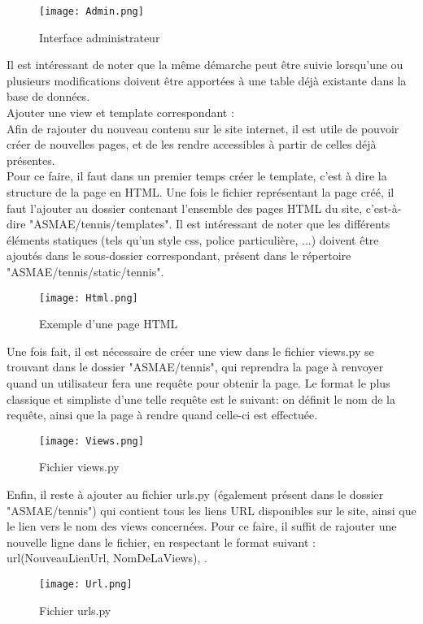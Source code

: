 \begin{figure}
\centering
\texttt{[image: Admin.png]}
\caption{Interface administrateur}
\end{figure}

Il est intéressant de noter que la même démarche peut être suivie lorsqu'une ou plusieurs modifications doivent être apportées à une table déjà existante dans la base de données.\\

Ajouter une view et template correspondant :\\

Afin de rajouter du nouveau contenu sur le site internet, il est utile de pouvoir créer de nouvelles pages, et de les rendre accessibles à partir de celles déjà présentes.\\

Pour ce faire, il faut dans un premier temps créer le template, c'est à dire la structure de la page en HTML. Une fois le fichier représentant la page créé, il faut l'ajouter au dossier contenant l'ensemble des pages HTML du site, c'est-à-dire "ASMAE/tennis/templates". Il est intéressant de noter que les différents éléments statiques (tels qu'un style css, police particulière, ...) doivent être ajoutés dans le sous-dossier correspondant, présent dans le répertoire "ASMAE/tennis/static/tennis".\\

\begin{figure}
\centering
\texttt{[image: Html.png]}
\caption{Exemple d'une page HTML}
\end{figure}

Une fois fait, il est nécessaire de créer une view dans le fichier views.py se trouvant dans le dossier "ASMAE/tennis", qui reprendra la page à renvoyer quand un utilisateur fera une requête pour obtenir la page. Le format le plus classique et simpliste d'une telle requête est le suivant: on définit le nom de la requête, ainsi que la page à rendre quand celle-ci est effectuée.\\

\begin{figure}
\centering
\texttt{[image: Views.png]}
\caption{Fichier views.py}
\end{figure}

Enfin, il reste à ajouter au fichier urls.py (également présent dans le dossier "ASMAE/tennis") qui contient tous les liens URL disponibles sur le site, ainsi que le lien vers le nom des views concernées. Pour ce faire, il suffit de rajouter une nouvelle ligne dans le fichier, en respectant le format suivant : url(NouveauLienUrl, NomDeLaViews), .

\begin{figure}
\centering
\texttt{[image: Url.png]}
\caption{Fichier urls.py}
\end{figure}
